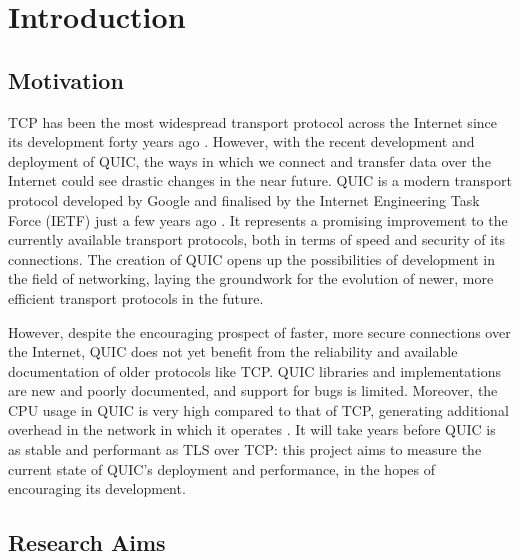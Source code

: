 \documentclass{l4proj}
\begin{document}

\def\consentname {Lara D'Agata} 
\def\consentdate {March 20, 2024} 
\educationalconsent


\tableofcontents


\chapter{Introduction}


\section{Motivation}

TCP has been the most widespread transport protocol across the Internet since its development forty years ago \citep{Postel1981}. However, with the recent development and deployment of QUIC, the ways in which we connect and transfer data over the Internet could see drastic changes in the near future. QUIC is a modern transport protocol developed by Google and finalised by the Internet Engineering Task Force (IETF) just a few years ago \citep{Iyen2021}. It represents a promising improvement to the currently available transport protocols, both in terms of speed and security of its connections. The creation of QUIC opens up the possibilities of development in the field of networking, laying the groundwork for the evolution of newer, more efficient transport protocols in the future. 

However, despite the encouraging prospect of faster, more secure connections over the Internet, QUIC does not yet benefit from the reliability and available documentation of older protocols like TCP. QUIC libraries and implementations are new and poorly documented, and support for bugs is limited. Moreover, the CPU usage in QUIC is very high compared to that of TCP, generating additional overhead in the network in which it operates \citep{Shreed2022}. It will take years before QUIC is as stable and performant as TLS over TCP: this project aims to measure the current state of QUIC's deployment and performance, in the hopes of encouraging its development.

\section{Research Aims}
\end{document}
